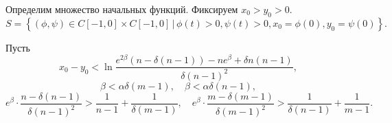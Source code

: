 Определим множество начальных функций. Фиксируем $x_0 > y_0 > 0$.
\small
\begin{equation}
	\label{eq:initial_set}
	S = \left\{(\phi, \psi) \in C[-1, 0] \times C[-1, 0] \,|\, \phi(t) > 0, \psi(t) > 0, x_0 = \phi(0), y_0 = \psi(0)\right\}.
\end{equation}
\normalsize

\begin{theorem}
	\label{thm:relay_solution}
	Пусть 
	\begin{equation}
		\label{eq:constraint_1}
		x_0 - y_0 < \ln \dfrac{e^{2\beta}(n - \delta(n - 1)) - ne^{\beta} + \delta n(n - 1)}{\delta (n - 1)^2},
	\end{equation}
	\begin{equation}
		\label{eq:constraint_2}
		\beta < \alpha \delta (m - 1), \quad \beta < \alpha \delta (n - 1),
	\end{equation}
	\small
	\begin{equation}
		\label{eq:constraint_3}
		e^{\beta} \cdot \dfrac{n - \delta(n - 1)}{\delta (n - 1)^2} > \dfrac{1}{n - 1} + \dfrac{1}{\delta(m - 1)}, \quad
		e^{\beta} \cdot \dfrac{m - \delta(m - 1)}{\delta (m - 1)^2} > \dfrac{1}{\delta(n - 1)} + \dfrac{1}{m - 1}.
	\end{equation}
	\normalsize
	

\end{theorem}
